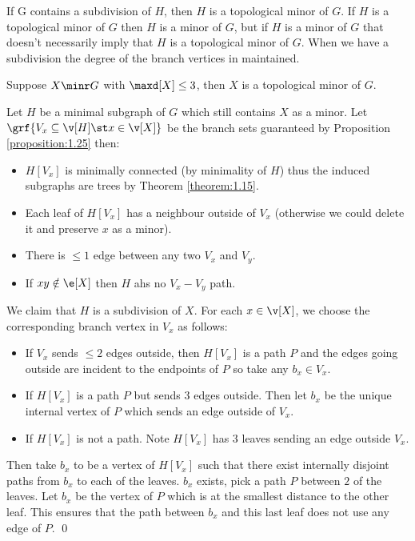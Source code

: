 If G contains a subdivision of $H$, then $H$ is a topological minor of $G$. If $H$ is a topological minor of $G$ then $H$ is a minor of $G$, but if $H$ is a minor of $G$ that doesn't necessarily imply that $H$ is a topological minor of $G$. When we have a subdivision the degree of the branch vertices in maintained.
\begin{customproposition}{1.27}
    \label{proposition:1.27}
    Suppose $X \minr G$ with $\maxd[X] \leq 3$, then $X$ is a topological minor of $G$.
\end{customproposition}
\begin{prf}
    Let $H$ be a minimal subgraph of $G$ which still contains $X$ as a minor. Let $\grf{V_x \subseteq \v[H] \st x \in \v[X]}$ be the branch sets guaranteed by Proposition \ref{proposition:1.25} then:
    \begin{itemize}
        \item $H[V_x]$ is minimally connected (by minimality of $H$) thus the induced subgraphs are trees by Theorem \ref{theorem:1.15}.
        \item Each leaf of $H[V_x]$ has a neighbour outside of $V_x$ (otherwise we could delete it and preserve $x$ as a minor).
        \item There is $\leq 1$ edge between any two $V_x$ and $V_y$.
        \item If $xy \notin \e[X]$ then $H$ ahs no $V_x - V_y$ path.
    \end{itemize}
    We claim that $H$ is a subdivision of $X$. For each $x \in \v[X]$, we choose the corresponding branch vertex in $V_x$ as follows:
    \begin{itemize}
        \item If $V_x$ sends $\leq 2$ edges outside, then $H[V_x]$ is a path $P$ and the edges going outside are incident to the endpoints of $P$ so take any $b_x \in V_x$.
        \item If $H[V_x]$ is a path $P$ but sends $3$ edges outside. Then let $b_x$ be the unique internal vertex of $P$ which sends an edge outside of $V_x$.
        \item If $H[V_x]$ is not a path. Note $H[V_x]$ has $3$ leaves sending an edge outside $V_x.$
    \end{itemize}
    Then take $b_x$ to be a vertex of $H[V_x]$ such that there exist internally disjoint paths from $b_x$ to each of the leaves. $b_x$ exists, pick a path $P$ between $2$ of the leaves. Let $b_x$ be the vertex of $P$ which is at the smallest distance to the other leaf. This ensures that the path between $b_x$ and this last leaf does not use any edge of $P$. \qed
\end{prf}